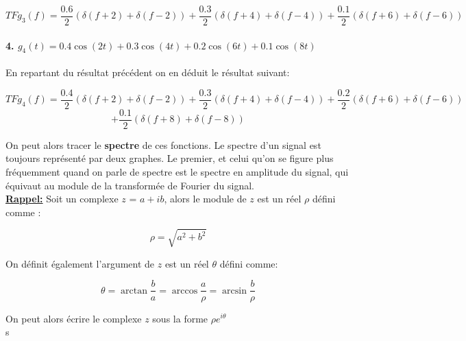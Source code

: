 \documentclass[11pt,a4paper]{article}
\begin{document}
\[TF{g_3}(f) = \frac{0.6}{2}(\delta(f+2) + \delta(f-2)) + \frac{0.3}{2}(\delta(f+4) + \delta(f-4)) + \frac{0.1}{2}(\delta(f+6) + \delta(f-6))\]

\paragraph{4. $g_4(t) = 0.4 \cos(2 t) + 0.3 \cos(4 t) + 0.2 \cos(6 t) + 0.1 \cos(8 t)$}
En repartant du résultat précédent on en déduit le résultat suivant:

\[TF{g_4}(f) = \frac{0.4}{2}(\delta(f+2) + \delta(f-2)) + \frac{0.3}{2}(\delta(f+4) + \delta(f-4)) + \frac{0.2}{2}(\delta(f+6) + \delta(f-6))\]
\[ + \frac{0.1}{2}(\delta(f+8) + \delta(f-8)) \]


On peut alors tracer le \textbf{spectre} de ces fonctions. Le spectre d'un signal est toujours représenté par deux graphes. Le premier, et celui qu'on se figure plus fréquemment quand on parle de spectre est le spectre en amplitude du signal, qui équivaut au module de la transformée de Fourier du signal.\\

\underline{\textbf{Rappel:}} Soit un complexe $z$ = $a + ib$, alors le module de $z$ est un réel $\rho$ défini comme :

\[ \rho = \sqrt{a^2 + b^2}  \]

On définit également l'argument de $z$ est un réel $\theta$ défini comme:

\[ \theta =  \arctan\frac{b}{a} = \arccos{\frac{a}{\rho}} = \arcsin{\frac{b}{\rho}} \] 

On peut alors écrire le complexe $z$ sous la forme $\rho e^{i \theta}$\\s
\end{document}
